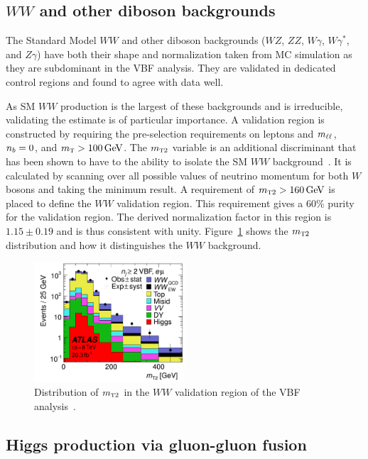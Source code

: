 \subsection{$WW$ and other diboson backgrounds}

The Standard Model $WW$ and other diboson backgrounds ($WZ$, $ZZ$, $W\gamma$, $W\gamma^{*}$, and $Z\gamma$) have both their shape and normalization taken from MC simulation as they are subdominant in the VBF analysis. They are validated in dedicated control regions and found to agree with data well.

As SM $WW$ production is the largest of these backgrounds and is irreducible, validating the estimate is of particular importance. A validation region is constructed by requiring the pre-selection requirements on leptons and $m_{\ell\ell}$, $n_b = 0$, and $\mTH > 100 \GeV$. The $m_{\textrm{\footnotesize\sc t}2}$ variable is an additional discriminant that has been shown to have to the ability to isolate the SM $WW$ background~\cite{mt2}. It is calculated by scanning over all possible values of neutrino momentum for both $W$ bosons and taking the minimum result. A requirement of $\mTtwo > 160 \GeV$ is placed to define the $WW$ validation region. This requirement gives a $60$\% purity for the validation region. The derived normalization factor in this region is $1.15 \pm 0.19$ and is thus consistent with unity. Figure~\ref{fig:mt2} shows the $m_{\textrm{\footnotesize\sc t}2}$ distribution and how it distinguishes the $WW$ background.

\begin{figure}[h!]
  \centering
  \captionsetup{justification=centering}
  \includegraphics[width=0.5\textwidth]{figures/VBF_mT2}
  \caption{Distribution of $m_{\textrm{\footnotesize\sc t}2}$ in the $WW$ validation region of the VBF analysis~\cite{WW2015}.}
  \label{fig:mt2}
\end{figure}

\subsection{Higgs production via gluon-gluon fusion}

